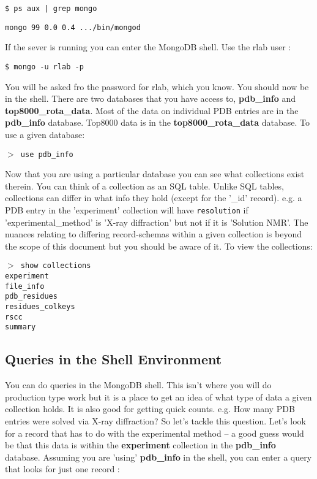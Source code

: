 \documentclass[12pt]{article}
\newcommand{\cmdline}[1]{\vspace{5mm} \noindent
\texttt{\$ #1}
\vspace{5mm}

}
\newcommand{\mdbcmdline}[1]{\vspace{5mm} \noindent
\texttt{$>$ #1}
\vspace{5mm}

}
\newcommand{\mdbdb}[1]{{\color{BlueViolet}\textbf{#1}}}
\newcommand{\mdbcol}[1]{{\color{Bittersweet}\textbf{#1}}}
\begin{document}
\cmdline{ps aux | grep mongo}
\noindent
\texttt{mongo 99 0.0 0.4 .../bin/mongod}

\vspace{5mm}
\noindent
If the sever is running you can enter the MongoDB shell. Use the rlab user :

\cmdline{mongo -u rlab -p}
\noindent
You will be asked fro the password for rlab, which you know.
You should now be in the shell.
There are two databases that you have access to,  \mdbdb{pdb\_info} and \mdbdb{top8000\_rota\_data}.
Most of the data on individual PDB entries are in the \mdbdb{pdb\_info} database.
Top8000 data is in the \mdbdb{top8000\_rota\_data} database.
\noindent
To use a given database:

\mdbcmdline{use pdb\_info}
\noindent
Now that you are using a particular database you can see what collections exist therein. 
You can think of a collection as an SQL table.
Unlike SQL tables, collections can differ in what info they hold (except for the '\_id' record).
e.g. a PDB entry in the 'experiment' collection will have \texttt{resolution} if 'experimental\_method' is 'X-ray diffraction' but not if it is 'Solution NMR'.
The nuances relating to differing record-schemas within a given collection is beyond the scope of this document but you should be aware of it. To view the collections:

\mdbcmdline{show collections\\
experiment\\
file\_info\\
pdb\_residues\\
residues\_colkeys\\
rscc\\
summary}

\subsection{Queries in the Shell Environment}
You can do queries in the MongoDB shell. 
This isn't where you will do production type work but it is a place to get an idea of what type of data a given collection holds.
It is also good for getting quick counts.
e.g. How many PDB entries were solved via X-ray diffraction?
So let's tackle this question.
Let's look for a record that has to do with the experimental method -- a good guess would be that this data is within the \mdbcol{experiment} collection in the \mdbdb{pdb\_info} database.
Assuming you are 'using' \mdbdb{pdb\_info} in the shell, you can enter a query that looks for just one record :
\end{document}
